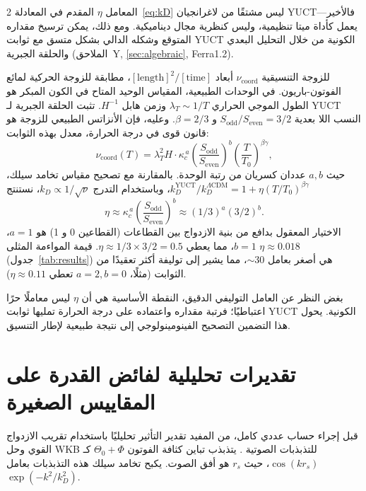 \documentclass[11pt,a4paper]{article}
\begin{document}
\begin{multicols}{2}
		المعامل \(\eta\) المقدم في المعادلة~\eqref{eq:kD} ليس مشتقًا من لاغرانجيان YUCT—فالأخير يعمل كأداة ميتا تنظيمية، وليس كنظرية مجال ديناميكية. ومع ذلك، يمكن ترسيخ مقداره المتوقع وشكله الدالي بشكل متسق مع ثوابت YUCT الكونية من خلال التحليل البعدي والحلقة الجبرية (الملاحق~Y, \ref{sec:algebraic}, Ferra1.2).
		
		للزوجة التنسيقية \(\nu_{\mathrm{coord}}\) أبعاد \([\mathrm{length}]^2/[\mathrm{time}]\)، مطابقة للزوجة الحركية لمائع الفوتون-باريون. في الوحدات الطبيعية، المقياس الوحيد المتاح في الكون المبكر هو الطول الموجي الحراري \(\lambda_T \sim 1/T\) وزمن هابل \(H^{-1}\). تثبت الحلقة الجبرية لـ YUCT النسب اللا بعدية \(S_{\mathrm{odd}}/S_{\mathrm{even}} = 3/2\) و \(\beta = 2/3\). وعليه، فإن الأنزاتس الطبيعي للزوجة هو قانون قوى في درجة الحرارة، معدل بهذه الثوابت:
		\begin{equation}
			\nu_{\mathrm{coord}}(T) = \lambda_T^2 H \cdot \kappa_c^{\,a} \left(\frac{S_{\mathrm{odd}}}{S_{\mathrm{even}}}\right)^b \left(\frac{T}{T_0}\right)^{\beta\gamma},
		\end{equation}
		حيث \(a,b\) عددان كسريان من رتبة الوحدة. بالمقارنة مع تصحيح مقياس تخامد سيلك، \(k_D^{\mathrm{YUCT}}/k_D^{\Lambda\mathrm{CDM}} = 1 + \eta (T/T_0)^{\beta\gamma}\)، وباستخدام التدرج \(k_D \propto 1/\sqrt{\nu}\)، نستنتج
		\begin{equation}
			\eta \approx \kappa_c^{\,a} \left(\frac{S_{\mathrm{odd}}}{S_{\mathrm{even}}}\right)^b \approx (1/3)^a (3/2)^b.
		\end{equation}
		الاختيار المعقول بدافع من بنية الازدواج بين القطاعات (القطاعين 0 و 1) هو \(a=1\)، \(b=1\)، مما يعطي \(\eta \approx 1/3 \times 3/2 = 0.5\). قيمة المواءمة المثلى \(\eta \approx 0.018\) (جدول~\ref{tab:results}) هي أصغر بعامل \(\sim 30\)، مما يشير إلى توليفة أكثر تعقيدًا من الثوابت (مثلًا، \(a=2, b=0\) تعطي \(\eta \approx 0.11\)). 
		
		بغض النظر عن العامل التوليفي الدقيق، النقطة الأساسية هي أن \(\eta\) ليس معاملًا حرًا اعتباطيًا؛ فرتبة مقداره واعتماده على درجة الحرارة تمليها ثوابت YUCT الكونية. يحول هذا التضمين التصحيح الفينومينولوجي إلى نتيجة طبيعية لإطار التنسيق.
		
		\section{تقديرات تحليلية لفائض القدرة على المقاييس الصغيرة}
		
		قبل إجراء حساب عددي كامل، من المفيد تقدير التأثير تحليليًا باستخدام تقريب الازدواج القوي وحل WKB للتذبذبات الصوتية \cite{Hu1995}. يتذبذب تباين كثافة الفوتون $\Theta_0 + \Phi$ كـ $\cos(k r_s)$، حيث $r_s$ هو أفق الصوت. يكبح تخامد سيلك هذه التذبذبات بعامل $\exp(-k^2/k_D^2)$.
		

\end{multicols}
\end{document}

